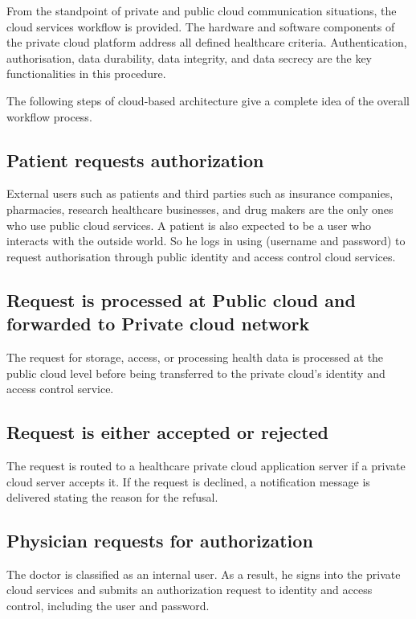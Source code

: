 \documentclass[12pt]{article}
\begin{document}
\indent
From the standpoint of private and public cloud communication situations, the cloud services workflow is provided. The hardware and software components of the private cloud platform address all defined healthcare criteria. Authentication, authorisation, data durability, data integrity, and data secrecy are the key functionalities in this procedure.

\indent

The following steps of cloud-based architecture give a complete idea of the overall workflow process.

\subsection{Patient requests authorization}
External users such as patients and third parties such as insurance companies, pharmacies, research healthcare businesses, and drug makers are the only ones who use public cloud services. A patient is also expected to be a user who interacts with the outside world. So he logs in using (username and password) to request authorisation through public identity and access control cloud services.

\subsection{Request is processed at Public cloud and forwarded to Private cloud network}
The request for storage, access, or processing health data is processed at the public cloud level before being transferred to the private cloud's identity and access control service.

\subsection{Request is either accepted or rejected}
The request is routed to a healthcare private cloud application server if a private cloud server accepts it. If the request is declined, a notification message is delivered stating the reason for the refusal.

\subsection{ Physician requests for authorization}
The doctor is classified as an internal user. As a result, he signs into the private cloud services and submits an authorization request to identity and access control, including the user and password.
\end{document}

